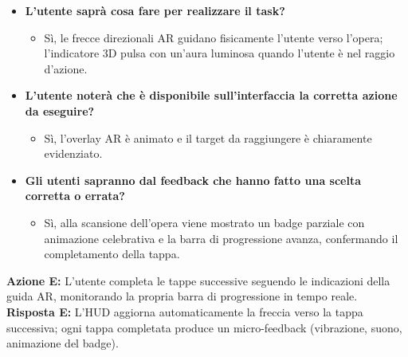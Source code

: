 \begin{itemize}[nosep, leftmargin=1.6em]
    \item \textbf{L'utente saprà cosa fare per realizzare il task?}
    \begin{itemize}[nosep, leftmargin=1.6em]
        \item Sì, le frecce direzionali AR guidano fisicamente l'utente verso l'opera; l'indicatore 3D pulsa con un'aura luminosa quando l'utente è nel raggio d'azione.
    \end{itemize}
    \item \textbf{L'utente noterà che è disponibile sull'interfaccia la corretta azione da eseguire?}
    \begin{itemize}[nosep, leftmargin=1.6em]
        \item Sì, l'overlay AR è animato e il target da raggiungere è chiaramente evidenziato.
    \end{itemize}
    \item \textbf{Gli utenti sapranno dal feedback che hanno fatto una scelta corretta o errata?}
    \begin{itemize}[nosep, leftmargin=1.6em]
        \item Sì, alla scansione dell'opera viene mostrato un badge parziale con animazione celebrativa e la barra di progressione avanza, confermando il completamento della tappa.
    \end{itemize}
\end{itemize}

\vspace{0.3cm}
\noindent\textbf{Azione E:} L'utente completa le tappe successive seguendo le indicazioni della guida AR, monitorando la propria barra di progressione in tempo reale.\\
\textbf{Risposta E:} L'HUD aggiorna automaticamente la freccia verso la tappa successiva; ogni tappa completata produce un micro-feedback (vibrazione, suono, animazione del badge).

